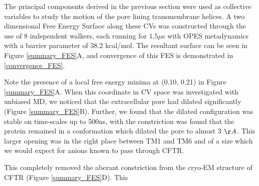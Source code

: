 The principal components derived in the previous section were used as collective variables to study the motion of the pore lining transmembrane helices. A two dimensional Free Energy Surface along these CVs was constructed through the use of 8 independent walkers, each running for $1.5\mu$s with OPES metadynamics with a barrier parameter of 38.2 kcal/mol. The resultant surface can be seen in Figure \ref{summary_FES}A, and convergence of this FES is demonstrated in \ref{convergence_FES}. 

Note the presence of a local free energy minima at (0.10, 0.21) in Figure \ref{summary_FES}A. When this coordinate in CV space was investigated with unbiased MD, we noticed that the extracellular pore had dilated significantly (Figure \ref{summary_FES}B). Further, we found that the dilated configuration was stable on time-scales up to 500ns, with the constriction  was found that the protein remained in a conformation which dilated the pore to almost 3 $\AA$. This larger opening was in the right place between TM1 and TM6 and of a size which we would expect for anions known to pass through CFTR. 

This completely removed the aberant constriction from the cryo-EM structure of CFTR (Figure \ref{summary_FES}D). This 

